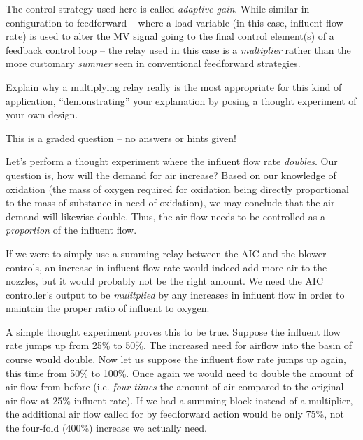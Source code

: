 The control strategy used here is called {\it adaptive gain}.  While similar in configuration to feedforward -- where a load variable (in this case, influent flow rate) is used to alter the MV signal going to the final control element(s) of a feedback control loop -- the relay used in this case is a {\it multiplier} rather than the more customary {\it summer} seen in conventional feedforward strategies.

\vskip 10pt

Explain why a multiplying relay really is the most appropriate for this kind of application, ``demonstrating'' your explanation by posing a thought experiment of your own design.

\vfil 

\eject






This is a graded question -- no answers or hints given!







Let's perform a thought experiment where the influent flow rate {\it doubles}.  Our question is, how will the demand for air increase?  Based on our knowledge of oxidation (the mass of oxygen required for oxidation being directly proportional to the mass of substance in need of oxidation), we may conclude that the air demand will likewise double.  Thus, the air flow needs to be controlled as a {\it proportion} of the influent flow.

\vskip 10pt

If we were to simply use a summing relay between the AIC and the blower controls, an increase in influent flow rate would indeed add more air to the nozzles, but it would probably not be the right amount.  We need the AIC controller's output to be {\it mulitplied} by any increases in influent flow in order to maintain the proper ratio of influent to oxygen.

A simple thought experiment proves this to be true.  Suppose the influent flow rate jumps up from 25\% to 50\%.  The increased need for airflow into the basin of course would double.  Now let us suppose the influent flow rate jumps up again, this time from 50\% to 100\%.  Once again we would need to double the amount of air flow from before (i.e. {\it four times} the amount of air compared to the original air flow at 25\% influent rate).  If we had a summing block instead of a multiplier, the additional air flow called for by feedforward action would be only 75\%, not the four-fold (400\%) increase we actually need.

